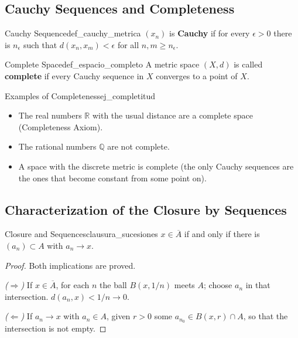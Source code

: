 \documentclass[11pt, a4paper]{article}
\begin{document}
\subsection{Cauchy Sequences and Completeness}

\begin{definicion}{Cauchy Sequence}{def_cauchy_metrica}
$(x_n)$ is \textbf{Cauchy} if for every $\epsilon > 0$ there is $n_\epsilon$ such that
$d(x_n, x_m) < \epsilon$ for all $n, m \ge n_\epsilon$.
\end{definicion}

\begin{definicion}{Complete Space}{def_espacio_completo}
A metric space $(X, d)$ is called \textbf{complete} if every Cauchy sequence in $X$ converges to a
point of $X$.
\end{definicion}

\begin{ejemplo}{Examples of Completeness}{ej_completitud}
\begin{itemize}
    \item The real numbers $\mathbb{R}$ with the usual distance are a complete space (Completeness
    Axiom).
    \item The rational numbers $\mathbb{Q}$ are not complete.
    \item A space with the discrete metric is complete (the only Cauchy sequences are the ones
    that become constant from some point on).
\end{itemize}
\end{ejemplo}

\subsection{Characterization of the Closure by Sequences}

\begin{proposicion}{Closure and Sequences}{clausura_sucesiones}
$x \in \overline{A}$ if and only if there is $(a_n) \subset A$ with $a_n \to x$.
\end{proposicion}

\begin{proof}
Both implications are proved.

\textit{($\Rightarrow$)} If $x \in \overline{A}$, for each $n$ the ball $B(x, 1/n)$ meets $A$;
choose $a_n$ in that intersection. $d(a_n, x) < 1/n \to 0$.

\textit{($\Leftarrow$)} If $a_n \to x$ with $a_n \in A$, given $r > 0$ some $a_{n_0} \in B(x, r) \cap A$,
so that the intersection is not empty.
\end{proof}
\end{document}

